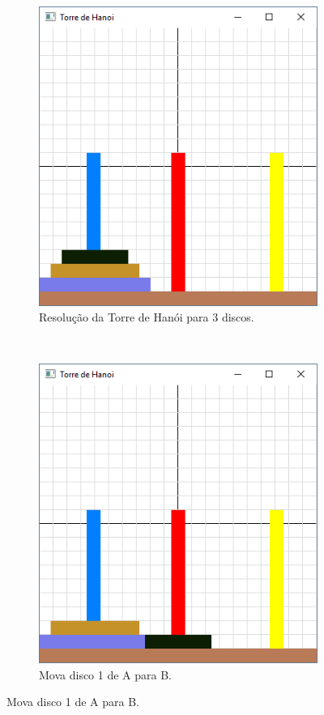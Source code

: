 \begin{figure}[H]
  \centering
  \begin{subfigure}[t]{.25\textwidth}
    \includegraphics[scale=0.3]{img/hanoi_4a}
    \caption{Resolução da Torre de Hanói para 3 discos.} 
  \end{subfigure}
  ~
  \begin{subfigure}[t]{.25\textwidth}
    \includegraphics[scale=0.3]{img/hanoi_4b}
    \caption{Mova disco 1 de A para B.} 
  \end{subfigure}

\end{figure}
